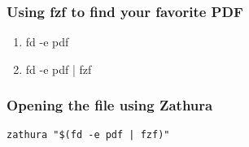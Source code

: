 \documentclass[titlepage]{article}
\begin{document}
\subsubsection{Using fzf to find your favorite PDF}
\begin{enumerate}
\item fd -e pdf

\item fd -e pdf | fzf
\end{enumerate}

\subsubsection{Opening the file using Zathura}
\begin{verbatim}
zathura "$(fd -e pdf | fzf)"
\end{verbatim}
\end{document}
